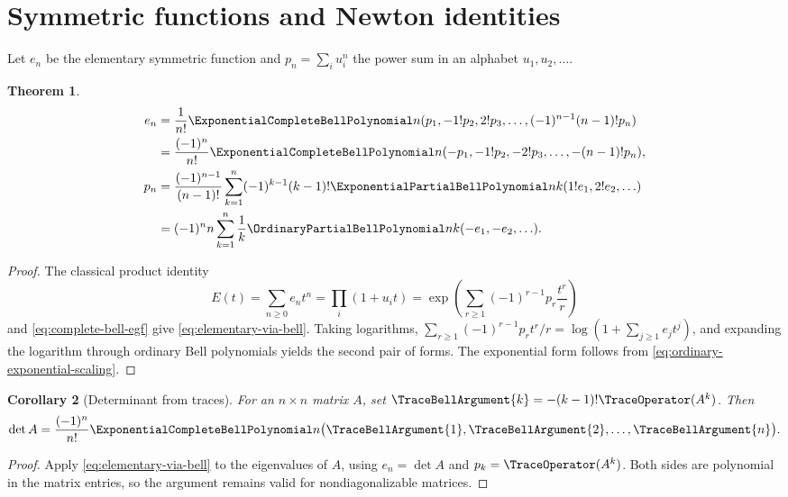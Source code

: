 \documentclass[11pt,a4paper,oneside,openany]{book}
\newtheorem{theorem}{Theorem}[chapter]
\newtheorem{corollary}[theorem]{Corollary}
\theoremstyle{definition}
\theoremstyle{remark}
\begin{document}
\section{Symmetric functions and Newton identities}
Let $e_n$ be the elementary symmetric function and
$p_n=\sum_i u_i^n$ the power sum in an alphabet $u_1,u_2,\ldots$.
\begin{theorem}\label{thm:bell-symmetric-functions}
\begin{align}
 e_n&=\frac1{n!}\ExponentialCompleteBellPolynomial n(p_1,-1!p_2,2!p_3,\ldots,(-1)^{n-1}(n-1)!p_n)
 \label{eq:elementary-via-bell}\\
 &=\frac{(-1)^n}{n!}\ExponentialCompleteBellPolynomial n(-p_1,-1!p_2,-2!p_3,\ldots,-(n-1)!p_n),
 \notag\\
 p_n&=\frac{(-1)^{n-1}}{(n-1)!}
 \sum_{k=1}^{n}(-1)^{k-1}(k-1)!
 \ExponentialPartialBellPolynomial nk(1!e_1,2!e_2,\ldots)
 \label{eq:powersum-via-bell}\\
 &=(-1)^n n\sum_{k=1}^{n}\frac1k
 \OrdinaryPartialBellPolynomial nk(-e_1,-e_2,\ldots).
 \notag
\end{align}
\end{theorem}
\begin{proof}
The classical product identity
\[
 E(t)=\sum_{n\ge0}e_nt^n=\prod_i(1+u_it)
 =\exp\!\left(\sum_{r\ge1}(-1)^{r-1}p_r\frac{t^r}{r}\right)
\]
and \eqref{eq:complete-bell-egf} give \eqref{eq:elementary-via-bell}.
Taking logarithms,
$\sum_{r\ge1}(-1)^{r-1}p_rt^r/r=\log(1+\sum_{j\ge1}e_jt^j)$, and expanding
the logarithm through ordinary Bell polynomials yields the second pair of forms.
The exponential form follows from \eqref{eq:ordinary-exponential-scaling}.
\end{proof}

\begin{corollary}[Determinant from traces]\label{cor:det-traces-bell}
For an $n\times n$ matrix $A$, set
$\TraceBellArgument{k}=-(k-1)!\TraceOperator(A^k)$.  Then
\begin{equation}\label{eq:det-traces-bell}
 \det A=\frac{(-1)^n}{n!}\ExponentialCompleteBellPolynomial n\bigl(
   \TraceBellArgument{1},\TraceBellArgument{2},\ldots,\TraceBellArgument{n}\bigr).
\end{equation}
\end{corollary}
\begin{proof}
Apply \eqref{eq:elementary-via-bell} to the eigenvalues of $A$, using
$e_n=\det A$ and $p_k=\TraceOperator(A^k)$.  Both sides are polynomial in the matrix entries,
so the argument remains valid for nondiagonalizable matrices.
\end{proof}
\end{document}
